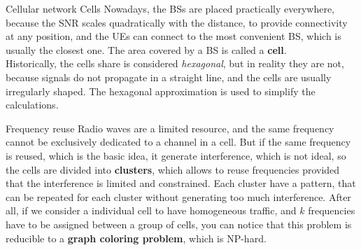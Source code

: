 \begin{section}{Cellular network Cells}
  Nowadays, the BSs are placed practically everywhere, because the SNR scales quadratically with the
  distance, to provide connectivity at any position, and the UEs can connect to the most convenient
  BS, which is usually the closest one. The area covered by a BS is called a \textbf{cell}.\\
  Historically, the cells share is considered \textit{hexagonal}, but in reality they are not, because
  signals do not propagate in a straight line, and the cells are usually irregularly shaped. The
  hexagonal approximation is used to simplify the calculations.
  \begin{subsection}{Frequency reuse}
    Radio waves are a limited resource, and the same frequency cannot be exclusively dedicated to a
    channel in a cell. But if the same frequency is reused, which is the basic idea, it generate
    interference, which is not ideal, so the cells are divided into \textbf{clusters}, which allows
    to reuse frequencies provided that the interference is limited and constrained. Each cluster
    have a pattern, that can be repeated for each cluster without generating too much interference.
    After all, if we consider a individual cell to have homogeneous traffic, and $k$ frequencies
    have to be assigned between a group of cells, you can notice that this problem is reducible to a
    \textbf{graph coloring problem}, which is NP-hard.
  \end{subsection}


\end{section}
